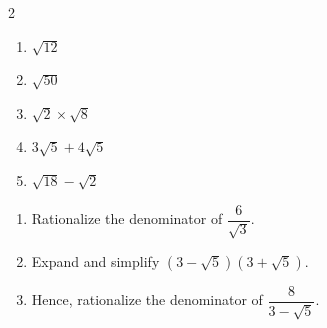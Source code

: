\documentclass[12pt, twoside]{article}
\begin{document}
\begin{enumerate}[itemsep=0.15cm]
\begin{multicols}{2}\raggedcolumns
\begin{enumerate}[itemsep=0.25cm]
  \item $\sqrt{12}$
  \item $\sqrt{50}$
  \item $\sqrt{2} \times \sqrt{8}$
  \columnbreak
  \item $3\sqrt{5} + 4\sqrt{5}$
  \item $\sqrt{18} - \sqrt{2}$
\end{enumerate}
\end{multicols}

\begin{enumerate}[itemsep=0.25cm]
  \item[(f)] Rationalize the denominator of $\dfrac{6}{\sqrt{3}}$.
  \item[(g)] Expand and simplify $\left(3 - \sqrt{5}\right)\left(3 + \sqrt{5}\right)$.
  \item[(h)] Hence, rationalize the denominator of $\dfrac{8}{3 - \sqrt{5}}$.
\end{enumerate}


\end{enumerate}
\end{document}
